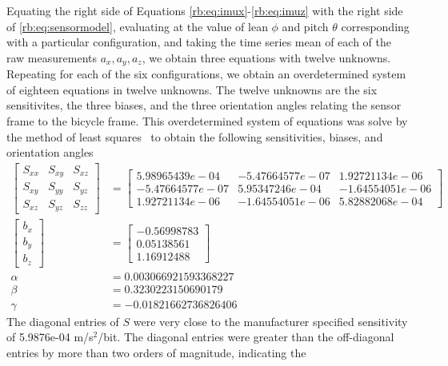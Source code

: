 Equating the right side of Equations \ref{rb:eq:imux}-\ref{rb:eq:imuz} with the
right side of \autoref{rb:eq:sensormodel}, evaluating at the value of lean
$\phi$ and pitch $\theta$ corresponding with a particular configuration, and
taking the time series mean of each of the raw measurements $a_x, a_y, a_z$, we
obtain three equations with twelve unknowns. Repeating for each of the six
configurations, we obtain an overdetermined system of eighteen equations in
twelve unknowns. The twelve unknowns are the six sensitivites, the three
biases, and the three orientation angles relating the sensor frame to the
bicycle frame. This overdetermined system of equations was solve by the method
of least squares~\cite{SciPy:optimize.leastsq} to obtain the following
sensitivities, biases, and orientation angles
\begin{align}
  \left[
    \begin{matrix}
      S_{xx} & S_{xy} & S_{xz}\\
      S_{xy} & S_{yy} & S_{yz}\\
      S_{xz} & S_{yz} & S_{zz}
    \end{matrix}
  \right]
  &=
  \left[
    \begin{matrix}
      5.98965439e-04 & -5.47664577e-07 & 1.92721134e-06 \\
     -5.47664577e-07 &  5.95347246e-04 & -1.64554051e-06 \\
      1.92721134e-06 & -1.64554051e-06 & 5.82882068e-04
    \end{matrix}
  \right]\\
  \left[
    \begin{matrix}
      b_{x} \\
      b_{y} \\
      b_{z}
    \end{matrix}
  \right]
  &=
  \left[
    \begin{matrix}
      -0.56998783 \\
       0.05138561 \\
       1.16912488
    \end{matrix}
  \right]\\
  \alpha &= 0.003066921593368227 \\
  \beta &= 0.3230223150690179 \\
  \gamma &= -0.01821662736826406
\end{align}
The diagonal entries of $S$ were very close to the manufacturer specified
sensitivity of 5.9876e-04 m/s$^2$/bit. The diagonal entries were greater than
the off-diagonal entries by more than two orders of magnitude, indicating the
